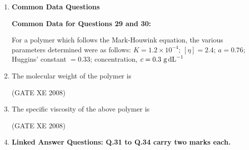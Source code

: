 \documentclass[12pt]{article}
\begin{document}
\begin{enumerate}
\begin{enumerate}
\item  Polymer X is Commodity and Polymer Z is Engineering Plastic 
\item  Polymer Y is Commodity and Polymer Z is Engineering Plastic 
\item  Polymer Z is Commodity and Polymer Y is Engineering Plastic 
\item  Polymer Y is Commodity and Polymer Z is Engineering Plastic 
\end{enumerate}

(GATE XE 2008)

\item[] \textbf{\Large Common Data Questions}

\textbf{Common Data for Questions 29 and 30:}

 For a polymer which follows the Mark-Houwink equation, the various parameters determined were as follows:  
$K = 1.2 \times 10^{-4}$; $[\eta] = 2.4$; $a = 0.76$; Huggins' constant $= 0.33$; concentration, $c = 0.3\ \text{g\,dL}^{-1}$

\item The molecular weight of the polymer is  

\begin{enumerate}
\end{enumerate}

(GATE XE 2008)

\item The specific viscosity of the above polymer is 

\begin{enumerate}
\end{enumerate}

(GATE XE 2008)



\item[] \textbf{\Large Linked Answer Questions: Q.31 to Q.34 carry two marks each.}


\end{enumerate}
\end{document}
